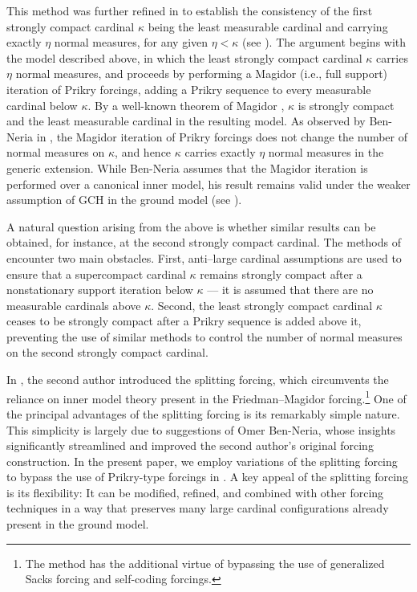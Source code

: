 \documentclass[11pt]{amsart}
\theoremstyle{definition}
\theoremstyle{remark}
\newcommand\<{{<}}
\begin{document}
\smallskip

This method was further refined in \cite{GitikKaplan} to establish the consistency of the first strongly compact cardinal $\kappa$ being the least measurable cardinal and carrying exactly $\eta$ normal measures, for any given $\eta<\kappa$ (see \cite[Theorem 4.17]{GitikKaplan}). The argument begins with the model described above, in which the least strongly compact cardinal $\kappa$ carries $\eta$ normal measures, and proceeds by performing a Magidor (i.e., full support) iteration of Prikry forcings, adding a Prikry sequence to every measurable cardinal below $\kappa$. By a well-known theorem of Magidor  \cite{MagidorIdentity}, $\kappa$ is strongly compact and the least measurable cardinal in the resulting model. As observed by Ben-Neria in \cite{BenNeriaMagidorIterations}, the Magidor iteration of Prikry forcings does not change the number of normal measures on $\kappa$, and hence $\kappa$ carries exactly $\eta$ normal measures in the generic extension. While Ben-Neria assumes that the Magidor iteration is performed over a canonical inner model, his result remains valid under the weaker assumption of GCH in the ground model (see \cite{KaplanMagidorIterations}).

\smallskip

A natural question arising from the above is whether similar results can be obtained, for instance, at the second strongly compact cardinal. The methods of \cite{GitikKaplan} encounter two main obstacles. First, anti–large cardinal assumptions are used to ensure that a supercompact cardinal $\kappa$ remains strongly compact after a nonstationary support iteration below $\kappa$ –– it is assumed that there are no measurable cardinals above $\kappa$. Second, the least strongly compact cardinal $\kappa$ ceases to be strongly compact after a Prikry sequence is added above it, preventing the use of similar methods to control the number of normal measures on the second strongly compact cardinal.



\smallskip

In \cite{Kaplan}, the second author introduced the splitting forcing, which circumvents the reliance on inner model theory present in the Friedman--Magidor forcing.\footnote{The method has the additional virtue of bypassing the use of generalized Sacks forcing and self-coding forcings.} One of the principal advantages of the splitting forcing is its remarkably simple nature. This simplicity is largely due to suggestions of Omer Ben-Neria, whose insights significantly streamlined and improved the second author’s original forcing construction. In the present paper, we employ variations of the splitting forcing to bypass the use of Prikry-type forcings in \cite{GitikKaplan}. A key appeal of the splitting forcing is its flexibility: It can be modified, refined, and combined with other forcing techniques in a way that preserves many large cardinal configurations already present in the ground model.
\end{document}
